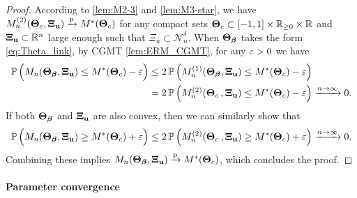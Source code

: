 \begin{proof}
According to \cref{lem:M2-3} and \ref{lem:M3-star}, we have $M_n^{(2)}(\text{\boldmath $\Theta$}_{c}, \text{\boldmath $\Xi$}_{\mathrm{\bf u}}) \xrightarrow{\mathrm{p}} M^*(\text{\boldmath $\Theta$}_{c})$ for any compact sets $\text{\boldmath $\Theta$}_{c} \subset [-1, 1] \times \mathbb{R}_{\ge 0} \times \mathbb{R}$ and $\text{\boldmath $\Xi$}_{\mathrm{\bf u}} \subset \mathbb{R}^{n}$ large enough such that $\Xi_{u} \subset \mathcal{N}^\delta_n$. When $\text{\boldmath $\Theta$}_{{\boldsymbol{\beta}}}$ takes the form \cref{eq:Theta_link}, by CGMT \cref{lem:ERM_CGMT}, for any $\varepsilon > 0$ we have
\begin{align*}
    \P \, \Bigl( M_n(\bTheta_{\vbeta}, \bXi_{\bu}) \le M^*(\bTheta_{c}) - \veps \Bigr) 
    & \le 2 \, \P \,\Bigl( M_n^{(1)}(\bTheta_{\vbeta}, \bXi_{\bu}) \le M^*(\bTheta_{c}) - \veps \Bigr) \\
    & = 2 \, \P \,\Bigl( M_n^{(2)}( \mathmakebox[\widthof{$\bTheta_{\vbeta}$}][l]{ \bTheta_{c} }, \bXi_{\bu}) \le M^*(\bTheta_{c}) - \veps \Bigr) \xrightarrow{n \to \infty} 0.
\end{align*}
If both $\text{\boldmath $\Theta$}_{{\boldsymbol{\beta}}}$ and $\text{\boldmath $\Xi$}_{\mathrm{\bf u}}$ are also convex, then we can similarly show that
\begin{equation*}
    \P \, \Bigl( M_n(\bTheta_{\vbeta}, \bXi_{\bu}) \ge M^*(\bTheta_{c}) + \veps \Bigr) 
    \le 2 \, \P \,\Bigl( M_n^{(2)}( \mathmakebox[\widthof{$\bTheta_{\vbeta}$}][l]{ \bTheta_{c} }, \bXi_{\bu}) \ge M^*(\bTheta_{c}) + \veps \Bigr) \xrightarrow{n \to \infty} 0.
\end{equation*}
Combining these implies $M_n(\text{\boldmath $\Theta$}_{{\boldsymbol{\beta}}}, \text{\boldmath $\Xi$}_{\mathrm{\bf u}}) \xrightarrow{\mathrm{p}} M^*(\text{\boldmath $\Theta$}_{c})$, which concludes the proof.
\end{proof}

\paragraph{Parameter convergence}

